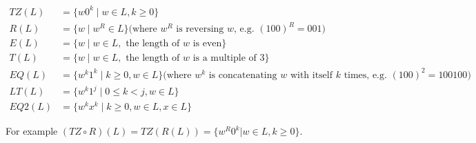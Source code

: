 	\begin{align*}
		TZ(L) &= \{ w0^k \mid w \in L, k \geq 0 \}\\
		R(L) &= \{ w \mid w^R \in L\} \textrm{(where $w^R$ is reversing $w$, e.g. $(100)^R = 001$)}\\
		E(L) &= \{ w \mid w \in L, \textrm{ the length of $w$ is even} \} \\
		T(L) &= \{ w \mid w \in L, \textrm{ the length of $w$ is a multiple of } 3 \}\\
		EQ(L) &= \{ w^k1^k \mid k \geq 0, w \in L \} \textrm{(where $w^k$ is concatenating $w$ with itself $k$ times, e.g. $(100)^2 = 100100$)}\\
		LT(L) &= \{ w^k1^j \mid 0 \leq k < j , w \in L \}\\
		EQ2(L) &= \{ w^kx^k \mid k \geq 0, w \in L, x \in L \}
	\end{align*}

	For example $(TZ \circ R)(L) = TZ(R(L)) = \{ w^R 0^k | w \in L, k \geq 0\}$.

